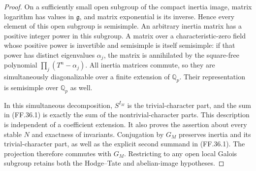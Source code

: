 \begin{proof}
On a sufficiently small open subgroup of
the compact inertia image, matrix logarithm
has values in \(\mathfrak g\), and matrix
exponential is its inverse. Hence every
element of this open subgroup is semisimple.
An arbitrary inertia matrix has a positive
integer power in this subgroup. A matrix
over a characteristic-zero field whose
positive power is invertible and semisimple
is itself semisimple: if that power has
distinct eigenvalues \(\alpha_j\), the
matrix is annihilated by the square-free
polynomial \(\prod_j(T^n-\alpha_j)\).
All inertia matrices commute, so they are
simultaneously diagonalizable over a finite
extension of \(\mathbb Q_p\). Their
representation is semisimple over
\(\mathbb Q_p\) as well.

In this simultaneous decomposition,
\(S^{I_M}\) is the trivial-character part,
and the sum in (FF.36.1) is exactly the
sum of the nontrivial-character parts.
This description is independent of a
coefficient extension. It also proves
the assertion about every stable \(N\)
and exactness of invariants. Conjugation
by \(G_M\) preserves inertia and its
trivial-character part, as well as the
explicit second summand in (FF.36.1).
The projection therefore commutes with
\(G_M\). Restricting to any open local
Galois subgroup retains both the
Hodge--Tate and abelian-image hypotheses.
\end{proof}

